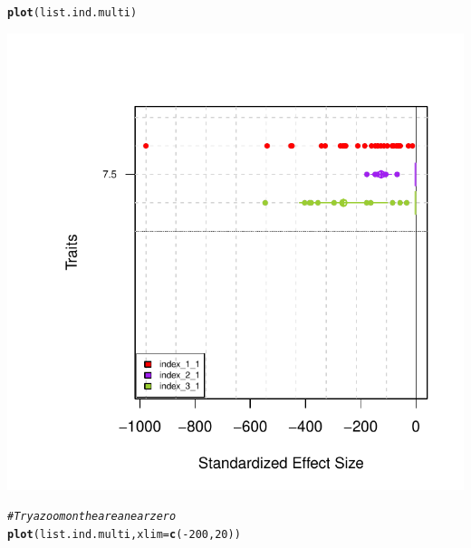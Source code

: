 \documentclass[12pt]{article}\usepackage[]{graphicx}\usepackage[]{color}
\makeatletter
\def\maxwidth{ %
  \ifdim\Gin@nat@width>\linewidth
    \linewidth
  \else
    \Gin@nat@width
  \fi
}
\newcommand{\hlnum}[1]{\textcolor[rgb]{0.686,0.059,0.569}{#1}}%
\newcommand{\hlcom}[1]{\textcolor[rgb]{0.678,0.584,0.686}{\textit{#1}}}%
\newcommand{\hlopt}[1]{\textcolor[rgb]{0,0,0}{#1}}%
\newcommand{\hlstd}[1]{\textcolor[rgb]{0.345,0.345,0.345}{#1}}%
\newcommand{\hlkwc}[1]{\textcolor[rgb]{0.333,0.667,0.333}{#1}}%
\newcommand{\hlkwd}[1]{\textcolor[rgb]{0.737,0.353,0.396}{\textbf{#1}}}%
\newenvironment{kframe}{%
 \def\at@end@of@kframe{}%
 \ifinner\ifhmode%
  \def\at@end@of@kframe{\end{minipage}}%
  \begin{minipage}{\columnwidth}%
 \fi\fi%
 \def\FrameCommand##1{\hskip\@totalleftmargin \hskip-\fboxsep
 \colorbox{shadecolor}{##1}\hskip-\fboxsep
     \hskip-\linewidth \hskip-\@totalleftmargin \hskip\columnwidth}%
 \MakeFramed {\advance\hsize-\width
   \@totalleftmargin\z@ \linewidth\hsize
   \@setminipage}}%
 {\par\unskip\endMakeFramed%
 \at@end@of@kframe}
\newenvironment{knitrout}{}{} %
\makeatother
\begin{document}
\begin{knitrout}
\color{fgcolor}\begin{kframe}
\begin{alltt}
\hlkwd{plot}\hlstd{(list.ind.multi)}
\end{alltt}
\end{kframe}

{\centering \includegraphics[width=\maxwidth]{figure/unnamed-chunk-60-1} 

}


\begin{kframe}\begin{alltt}
\hlcom{#Try a zoom on the area near zero}
\hlkwd{plot}\hlstd{(list.ind.multi,} \hlkwc{xlim} \hlstd{=} \hlkwd{c}\hlstd{(}\hlopt{-}\hlnum{200}\hlstd{,}\hlnum{20}\hlstd{))}
\end{alltt}
\end{kframe}


\end{knitrout}
\end{document}
